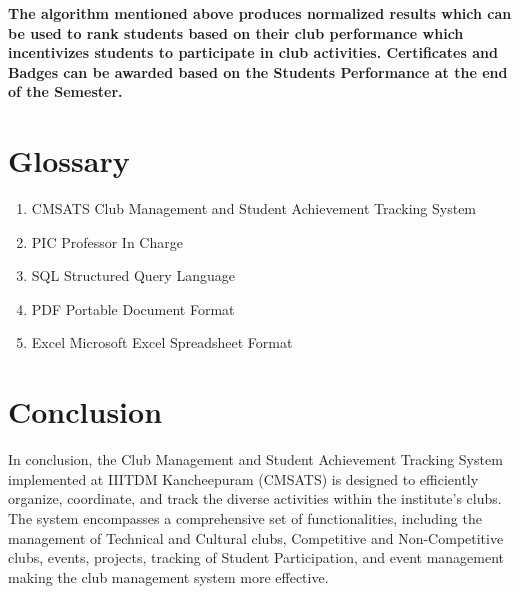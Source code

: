 \noindent \textbf{The algorithm mentioned above produces normalized results which can be used to rank students based on their club performance which incentivizes students to participate in club activities. Certificates and Badges can be awarded based on the Students Performance at the end of the Semester.}



\section{Glossary}
\begin{enumerate}
    \item CMSATS\: Club Management and Student Achievement Tracking System
    \item PIC\: Professor In Charge
    \item SQL\: Structured Query Language
    \item PDF\: Portable Document Format
    \item Excel\: Microsoft Excel Spreadsheet Format 
    
\end{enumerate}

\section{Conclusion}
In conclusion, the Club Management and Student Achievement Tracking System implemented at IIITDM Kancheepuram (CMSATS) is designed to efficiently organize, coordinate, and track the diverse activities within the institute's clubs. The system encompasses a comprehensive set of functionalities, including the management of Technical and Cultural clubs, Competitive and Non-Competitive clubs, events, projects, tracking of Student Participation, and event management making the club management system more effective.

